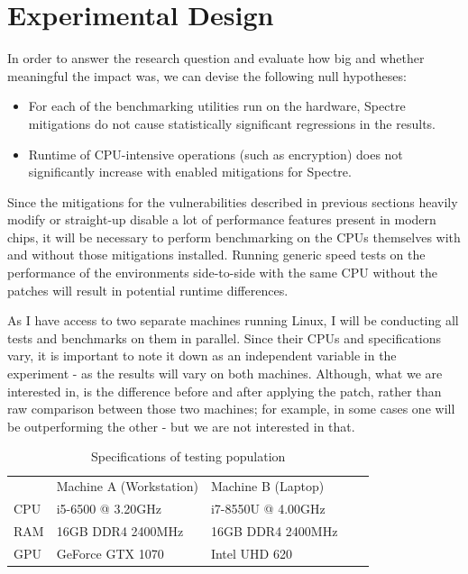 \documentclass{csfourzero}
\begin{document}
\section{Experimental Design}
\label{sec:exp}
In order to answer the research question and evaluate how big and whether meaningful the impact was, we can devise the following null hypotheses: 
\begin{itemize}
  \item For each of the benchmarking utilities run on the hardware, Spectre mitigations do not cause statistically significant regressions in the results.
  \item Runtime of CPU-intensive operations (such as encryption) does not significantly increase with enabled mitigations for Spectre.
\end{itemize}

Since the mitigations for the vulnerabilities described in previous sections heavily modify or straight-up disable a lot of performance features present in modern chips, it will be necessary to perform benchmarking on the CPUs themselves with and without those mitigations installed. Running generic speed tests on the performance of the environments side-to-side with the same CPU without the patches will result in potential runtime differences.

As I have access to two separate machines running Linux, I will be conducting all tests and benchmarks on them in parallel. Since their CPUs and specifications vary, it is important to note it down as an independent variable in the experiment - as the results will vary on both machines. Although, what we are interested in, is the difference before and after applying the patch, rather than raw comparison between those two machines; for example, in some cases one will be outperforming the other - but we are not interested in that.


\begin{table}[h]
\centering
\begin{tabular}{|l|l|l|ll}
\cline{1-3}
    & Machine A (Workstation)         & Machine B (Laptop) &  &  \\ \cline{1-3}
CPU & i5-6500 @ 3.20GHz & i7-8550U @ 4.00GHz       &  &  \\ \cline{1-3}
RAM & 16GB DDR4 2400MHz & 16GB DDR4 2400MHz          &  &  \\ \cline{1-3}
GPU & GeForce GTX 1070  & Intel UHD 620          &  &  \\ \cline{1-3}
\end{tabular}%
\caption{Specifications of testing population}
\label{tab:machines}
\end{table}
\end{document}
